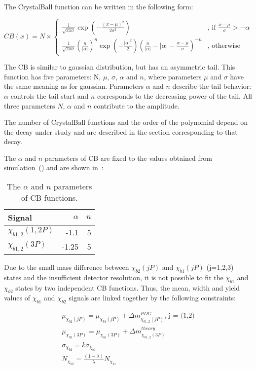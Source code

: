 The CrystalBall function can be written in the following form:

\begin{equation}
CB(x) = N \times
\begin{cases}
\frac{1}{\sqrt{2\pi\sigma}}\exp(-\frac{{(x-\mu)}^2}{2\sigma^2}) & \text{, if $\frac{x-\mu}{\sigma} > -\alpha$} \\
\frac{1}{\sqrt{2\pi\sigma}}{(\frac{n}{|\alpha|})}^n \exp(-\frac{|\alpha|^2}{2}){(\frac{n}{|\alpha|}-|\alpha|-\frac{x-\mu}{\sigma})}^{-n} & \text{, otherwise}
\end{cases}
\label{eq:cb}
\end{equation}

The CB is similar to gaussian distribution, but has an asymmetric tail. This
function has five parameters: N, $\mu$, $\sigma$, $\alpha$ and $n$, where
parameters $\mu$ and $\sigma$ have the same meaning as for gaussian. Parameters
$\alpha$ and $n$ describe the tail behavior: $\alpha$ controls the tail start
and $n$ corresponds to the decreasing power of the tail. All three parameters
$N$, $\alpha$ and $n$ contribute to the amplitude.

The number of CrystalBall functions and the order of the polynomial depend on
the decay under study and are described in the section corresponding to that
decay.


The $\alpha$ and $n$
parameters of CB are fixed to the values obtained from simulation~()
and are shown in~:


\begin{table}[H]
\caption{\small   The $\alpha$ and $n$ parameters of CB functions.}
\centering
\begin{tabular}{lrr}
\toprule
Signal & $\alpha$ & $n$ \\
\midrule
$\chi_{b1,2}(1,2P)$ & -1.1 & 5 \\
$\chi_{b1,2}(3P)$ & -1.25 & 5 \\
\bottomrule
\end{tabular}
\label{tab:chib:fit:tail}
\end{table}

Due to the small mass difference between $\chi_{b2}(jP)$ and $\chi_{b1}(jP)$
(j=1,2,3) states and the insufficient detector resolution, it is not possible
to fit the $\chi_{b1}$ and $\chi_{b2}$ states by two independent CB functions.
Thus, the mean, width and yield values of  $\chi_{b1}$ and $\chi_{b2}$ signals
are linked together by the following constraints:

\begin{equation}
  \begin{aligned}
\mu_{\chi_{b2}(jP)} = \mu_{\chi_{b1}(jP)} + \Delta m_{\chi_{b1,2}(jP)}^{PDG} \text{, j = (1,2)}\\
\mu_{\chi_{b2}(3P)} = \mu_{\chi_{b1}(3P)} + \Delta m_{\chi_{b1,2}(3P)}^{theory} \\
\sigma_{\chi_{b2}} = k \sigma_{\chi_{b1}}\\
N_{\chi_{b2}} = \frac{(1-\lambda)}{\lambda} N_{\chi_{b1}}
  \end{aligned}
\end{equation}


